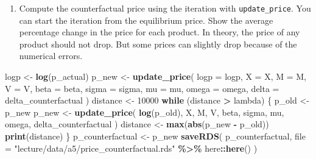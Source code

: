 \documentclass[
]{book}
\newenvironment{Shaded}{\begin{snugshade}}{\end{snugshade}}
\newcommand{\AttributeTok}[1]{\textcolor[rgb]{0.13,0.29,0.53}{#1}}
\newcommand{\ControlFlowTok}[1]{\textcolor[rgb]{0.13,0.29,0.53}{\textbf{#1}}}
\newcommand{\DecValTok}[1]{\textcolor[rgb]{0.00,0.00,0.81}{#1}}
\newcommand{\FunctionTok}[1]{\textcolor[rgb]{0.13,0.29,0.53}{\textbf{#1}}}
\newcommand{\NormalTok}[1]{#1}
\newcommand{\OtherTok}[1]{\textcolor[rgb]{0.56,0.35,0.01}{#1}}
\newcommand{\SpecialCharTok}[1]{\textcolor[rgb]{0.81,0.36,0.00}{\textbf{#1}}}
\newcommand{\StringTok}[1]{\textcolor[rgb]{0.31,0.60,0.02}{#1}}
\providecommand{\tightlist}{%
  \setlength{\itemsep}{0pt}\setlength{\parskip}{0pt}}
\begin{document}
\begin{enumerate}
\def\labelenumi{\arabic{enumi}.}
\setcounter{enumi}{1}
\tightlist
\item
  Compute the counterfactual price using the iteration with \texttt{update\_price}. You can start the iteration from the equilibrium price. Show the average percentage change in the price for each product. In theory, the price of any product should not drop. But some prices can slightly drop because of the numerical errors.
\end{enumerate}

\begin{Shaded}
\begin{Highlighting}[]
\NormalTok{logp }\OtherTok{\textless{}{-}} \FunctionTok{log}\NormalTok{(p\_actual)}
\NormalTok{p\_new }\OtherTok{\textless{}{-}} 
  \FunctionTok{update\_price}\NormalTok{(}
    \AttributeTok{logp =}\NormalTok{ logp, }
    \AttributeTok{X =}\NormalTok{ X, }
    \AttributeTok{M =}\NormalTok{ M, }
    \AttributeTok{V =}\NormalTok{ V, }
    \AttributeTok{beta =}\NormalTok{ beta, }
    \AttributeTok{sigma =}\NormalTok{ sigma, }
    \AttributeTok{mu =}\NormalTok{ mu, }
    \AttributeTok{omega =}\NormalTok{ omega, }
    \AttributeTok{delta =}\NormalTok{ delta\_counterfactual}
\NormalTok{    )}
\NormalTok{distance }\OtherTok{\textless{}{-}} \DecValTok{10000}
\ControlFlowTok{while}\NormalTok{ (distance }\SpecialCharTok{\textgreater{}}\NormalTok{ lambda) \{}
\NormalTok{  p\_old }\OtherTok{\textless{}{-}}\NormalTok{ p\_new}
\NormalTok{  p\_new }\OtherTok{\textless{}{-}} 
    \FunctionTok{update\_price}\NormalTok{(}
      \FunctionTok{log}\NormalTok{(p\_old), }
\NormalTok{      X, }
\NormalTok{      M, }
\NormalTok{      V, }
\NormalTok{      beta, }
\NormalTok{      sigma, }
\NormalTok{      mu, }
\NormalTok{      omega, }
\NormalTok{      delta\_counterfactual}
\NormalTok{      )}
\NormalTok{  distance }\OtherTok{\textless{}{-}} \FunctionTok{max}\NormalTok{(}\FunctionTok{abs}\NormalTok{(p\_new }\SpecialCharTok{{-}}\NormalTok{ p\_old))}
  \FunctionTok{print}\NormalTok{(distance)}
\NormalTok{\}}
\NormalTok{p\_counterfactual }\OtherTok{\textless{}{-}}\NormalTok{ p\_new}
\FunctionTok{saveRDS}\NormalTok{(}
\NormalTok{  p\_counterfactual, }
  \AttributeTok{file =} \StringTok{"lecture/data/a5/price\_counterfactual.rds"} \SpecialCharTok{\%\textgreater{}\%}\NormalTok{ here}\SpecialCharTok{::}\FunctionTok{here}\NormalTok{()}
\NormalTok{)}
\end{Highlighting}
\end{Shaded}
\end{document}

